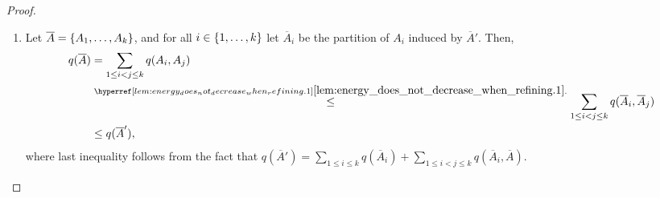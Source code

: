 \begin{lemma}
\begin{proof}
\begin{enumerate}[label={\Roman*}., ref={\Roman*}, font=\rmfamily]
                    \item
                        Let $\overline{A} = \{ A_1, \dots, A_k \}$, and for all $i \in \{ 1, \dots, k \}$ let
                        $\overline{A}_i$ be the partition of $A_i$ induced by $\overline{A}'$.
                        Then,
                        \begin{align*}
                            q(\overline{A})
                                & = \sum_{1 \leq i < j \leq k} q(A_i, A_j) \\
                                & \stackrel{\dref{lem:energy_does_not_decrease_when_refining.1}}{\leq}
                                    \sum_{1 \leq i < j \leq k} q(\overline{A}_i, \overline{A}_j) \\
                                & \leq q(\overline{A}'),
                        \end{align*}
                        where last inequality follows from the fact that
                        $q(\overline{A}') = \sum_{1 \leq i \leq k} q(\overline{A}_i) + \sum_{1 \leq i < j \leq k} q(\overline{A}_i, \overline{A})$.
                \end{enumerate}
            \end{proof}
        \end{lemma}

